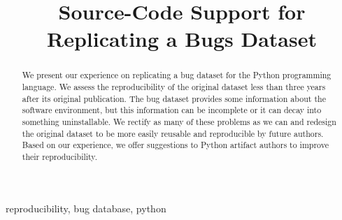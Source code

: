 \documentclass[conference]{IEEEtran}
\begin{document}
\title{Source-Code Support for Replicating a Bugs Dataset}

\author{
\and  
{}
\and
{}
}

\maketitle

\begin{abstract}
  We present our experience on replicating a bug dataset for the Python programming language.
  We assess the reproducibility of the original dataset less than three years after its original publication.
  The bug dataset provides some information about the software environment, but this information can be incomplete or it can decay into something uninstallable.
  We rectify as many of these problems as we can and redesign the original dataset to be more easily reusable and reproducible by future authors.
  Based on our experience, we offer suggestions to Python artifact authors to improve their reproducibility. 
\end{abstract}

\begin{IEEEkeywords}
reproducibility, bug database, python
\end{IEEEkeywords}





\printbibliography
\end{document}
